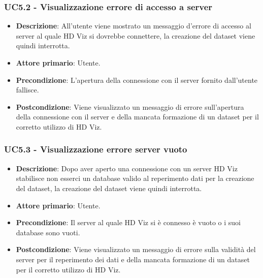 \subsubsection{UC5.2 - Visualizzazione errore di accesso a server}
\label{subsec:uc5.1.2}
\begin{itemize}
    \item \textbf{Descrizione}: All'utente viene mostrato un messaggio d'errore di accesso
                                al server al quale HD Viz si dovrebbe connettere, la creazione del dataset viene quindi interrotta.

    \item \textbf{Attore primario}: Utente.
    
    \item \textbf{Precondizione}:   L'apertura della connessione con il server fornito dall'utente fallisce.

    \item \textbf{Postcondizione}:  Viene visualizzato un messaggio di errore sull'apertura della connessione 
                                    con il server e della mancata formazione di un dataset per il corretto utilizzo di HD Viz.

\end{itemize}



\subsubsection{UC5.3 - Visualizzazione errore server vuoto}
\label{subsec:uc5.1.2}
\begin{itemize}
    \item \textbf{Descrizione}: Dopo aver aperto una connessione con un server HD Viz stabilisce non esserci
                                un database valido al reperimento dati per la creazione del dataset, la creazione
                                del dataset viene quindi interrotta.

    \item \textbf{Attore primario}: Utente.
    
    \item \textbf{Precondizione}:   Il server al quale HD Viz si è connesso è vuoto o i suoi database sono vuoti.

    \item \textbf{Postcondizione}:   Viene visualizzato un messaggio di errore sulla validità del server per il reperimento
                                    dei dati e della mancata formazione di un dataset per il corretto utilizzo di HD Viz.


\end{itemize}


